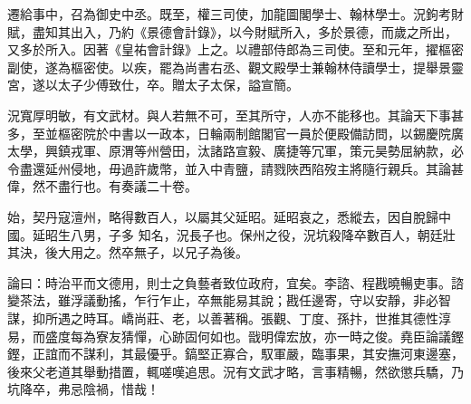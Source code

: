 \begin{pinyinscope}
 遷給事中，召為御史中丞。既至，權三司使，加龍圖閣學士、翰林學士。況鉤考財賦，盡知其出入，乃約《景德會計錄》，以今財賦所入，多於景德，而歲之所出，又多於所入。因著《皇祐會計錄》上之。以禮部侍郎為三司使。至和元年，擢樞密副使，遂為樞密使。以疾，罷為尚書右丞、觀文殿學士兼翰林侍讀學士，提舉景靈宮，遂以太子少傅致仕，卒。贈太子太保，謚宣簡。



 況寬厚明敏，有文武材。與人若無不可，至其所守，人亦不能移也。其論天下事甚多，至並樞密院於中書以一政本，日輪兩制館閣官一員於便殿備訪問，以錫慶院廣太學，興鎮戎軍、原渭等州營田，汰諸路宣毅、廣捷等冗軍，策元昊勢屈納款，必令盡還延州侵地，毋過許歲幣，並入中青鹽，請戮陜西陷歿主將隨行親兵。其論甚偉，然不盡行也。有奏議二十卷。



 始，契丹寇澶州，略得數百人，以屬其父延昭。延昭哀之，悉縱去，因自脫歸中國。延昭生八男，子多
 知名，況長子也。保州之役，況坑殺降卒數百人，朝廷壯其決，後大用之。然卒無子，以兄子為後。



 論曰：時治平而文德用，則士之負藝者致位政府，宜矣。李諮、程戡曉暢吏事。諮變茶法，雖浮議動搖，乍行乍止，卒無能易其說；戡任邊寄，守以安靜，非必智謀，抑所遇之時耳。嶠尚莊、老，以善著稱。張觀、丁度、孫抃，世推其德性淳易，而盛度每為寮友猜憚，心跡固何如也。戩明偉宏放，亦一時之俊。堯臣論議鏗鏗，正誼而不謀利，其最優乎。鎬堅正寡合，馭軍嚴，臨事果，其安撫河東邊塞，後來父老道其舉動措置，輒嗟嘆追思。況有文武才略，言事精暢，然欲懲兵驕，乃坑降卒，弗忌陰禍，惜哉！



\end{pinyinscope}